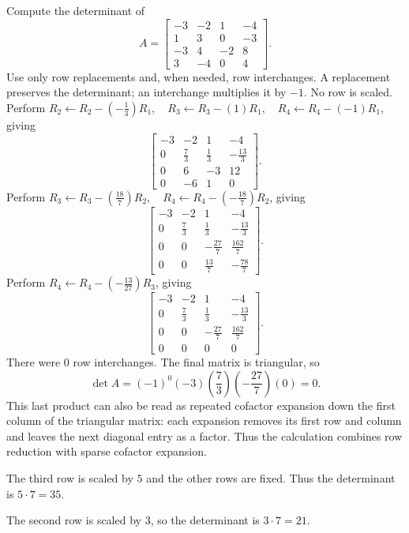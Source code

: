 \goal Compute the determinant of
\[A=\begin{bmatrix}-3&-2&1&-4\\1&3&0&-3\\-3&4&-2&8\\3&-4&0&4\end{bmatrix}.\]
Use only row replacements and, when needed, row interchanges. A replacement preserves the determinant; an interchange multiplies it by $-1$. No row is scaled.
Perform $R_2\leftarrow R_2-(- \frac{1}{3})R_1,\quad R_3\leftarrow R_3-(1)R_1,\quad R_4\leftarrow R_4-(-1)R_1$, giving
\[
\begin{bmatrix}-3&-2&1&-4\\0&\frac{7}{3}&\frac{1}{3}&- \frac{13}{3}\\0&6&-3&12\\0&-6&1&0\end{bmatrix}.
\]
Perform $R_3\leftarrow R_3-(\frac{18}{7})R_2,\quad R_4\leftarrow R_4-(- \frac{18}{7})R_2$, giving
\[
\begin{bmatrix}-3&-2&1&-4\\0&\frac{7}{3}&\frac{1}{3}&- \frac{13}{3}\\0&0&- \frac{27}{7}&\frac{162}{7}\\0&0&\frac{13}{7}&- \frac{78}{7}\end{bmatrix}.
\]
Perform $R_4\leftarrow R_4-(- \frac{13}{27})R_3$, giving
\[
\begin{bmatrix}-3&-2&1&-4\\0&\frac{7}{3}&\frac{1}{3}&- \frac{13}{3}\\0&0&- \frac{27}{7}&\frac{162}{7}\\0&0&0&0\end{bmatrix}.
\]
There were $0$ row interchanges. The final matrix is triangular, so
\[\det A=(-1)^{0}(-3)(\frac{7}{3})(- \frac{27}{7})(0)=0.\]
This last product can also be read as repeated cofactor expansion down the first column of the triangular matrix: each expansion removes its first row and column and leaves the next diagonal entry as a factor. Thus the calculation combines row reduction with sparse cofactor expansion.


The third row is scaled by $5$ and the other rows are fixed. Thus the determinant is $5\cdot7=35$.

The second row is scaled by $3$, so the determinant is $3\cdot7=21$.

